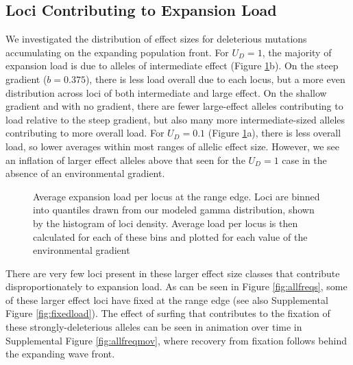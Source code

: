\subsection*{Loci Contributing to Expansion Load}
We investigated the distribution of effect sizes for deleterious mutations accumulating on the expanding population front. For $U_D = 1$, the majority of expansion load is due to alleles of intermediate effect (Figure \ref{fig:loci}b). On the steep gradient ($b = 0.375$), there is less load overall due to each locus, but a more even distribution across loci of both intermediate and large effect. On the shallow gradient and with no gradient, there are fewer large-effect alleles contributing to load relative to the steep gradient, but also many more intermediate-sized alleles contributing to more overall load. For $U_D = 0.1$ (Figure \ref{fig:loci}a), there is less overall load, so lower averages within most ranges of allelic effect size. However, we see an inflation of larger effect alleles above that seen for the $U_D= 1$ case in the absence of an environmental gradient.

\begin{figure}[H]
\centering
{}
\caption[~- Average expansion load per locus.]{Average expansion load per locus at the range edge. Loci are binned into quantiles drawn from our modeled gamma distribution, shown by the histogram of loci density. Average load per locus is then calculated for each of these bins and plotted for each value of the environmental gradient}
\label{fig:loci}
\end{figure}

There are very few loci present in these larger effect size classes that contribute disproportionately to expansion load. As can be seen in Figure \ref{fig:allfreqs}, some of these larger effect loci have fixed at the range edge (see also Supplemental Figure \ref{fig:fixedload}). The effect of surfing that contributes to the fixation of these strongly-deleterious alleles can be seen in animation over time in Supplemental Figure \ref{fig:allfreqmov}, where recovery from fixation follows behind the expanding wave front.



